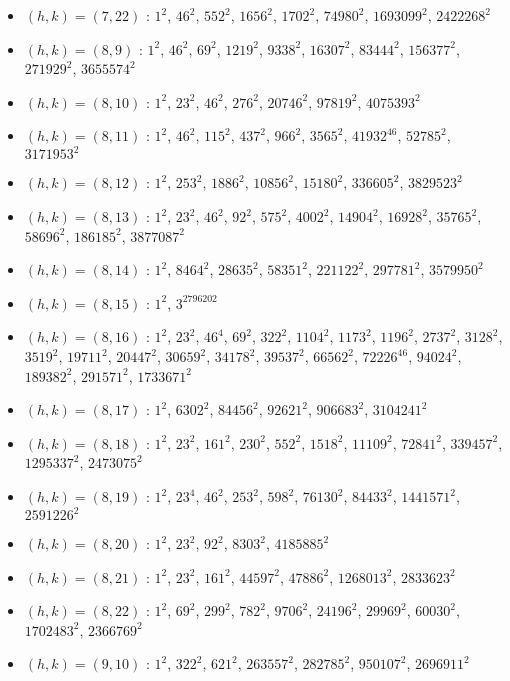 \begin{itemize}
\item $(h,k)=(7,22)$ : $1^{2}$, $46^{2}$, $552^{2}$, $1656^{2}$, $1702^{2}$, $74980^{2}$, $1693099^{2}$, $2422268^{2}$
\item $(h,k)=(8,9)$ : $1^{2}$, $46^{2}$, $69^{2}$, $1219^{2}$, $9338^{2}$, $16307^{2}$, $83444^{2}$, $156377^{2}$, $271929^{2}$, $3655574^{2}$
\item $(h,k)=(8,10)$ : $1^{2}$, $23^{2}$, $46^{2}$, $276^{2}$, $20746^{2}$, $97819^{2}$, $4075393^{2}$
\item $(h,k)=(8,11)$ : $1^{2}$, $46^{2}$, $115^{2}$, $437^{2}$, $966^{2}$, $3565^{2}$, $41932^{46}$, $52785^{2}$, $3171953^{2}$
\item $(h,k)=(8,12)$ : $1^{2}$, $253^{2}$, $1886^{2}$, $10856^{2}$, $15180^{2}$, $336605^{2}$, $3829523^{2}$
\item $(h,k)=(8,13)$ : $1^{2}$, $23^{2}$, $46^{2}$, $92^{2}$, $575^{2}$, $4002^{2}$, $14904^{2}$, $16928^{2}$, $35765^{2}$, $58696^{2}$, $186185^{2}$, $3877087^{2}$
\item $(h,k)=(8,14)$ : $1^{2}$, $8464^{2}$, $28635^{2}$, $58351^{2}$, $221122^{2}$, $297781^{2}$, $3579950^{2}$
\item $(h,k)=(8,15)$ : $1^{2}$, $3^{2796202}$
\item $(h,k)=(8,16)$ : $1^{2}$, $23^{2}$, $46^{4}$, $69^{2}$, $322^{2}$, $1104^{2}$, $1173^{2}$, $1196^{2}$, $2737^{2}$, $3128^{2}$, $3519^{2}$, $19711^{2}$, $20447^{2}$, $30659^{2}$, $34178^{2}$, $39537^{2}$, $66562^{2}$, $72226^{46}$, $94024^{2}$, $189382^{2}$, $291571^{2}$, $1733671^{2}$
\item $(h,k)=(8,17)$ : $1^{2}$, $6302^{2}$, $84456^{2}$, $92621^{2}$, $906683^{2}$, $3104241^{2}$
\item $(h,k)=(8,18)$ : $1^{2}$, $23^{2}$, $161^{2}$, $230^{2}$, $552^{2}$, $1518^{2}$, $11109^{2}$, $72841^{2}$, $339457^{2}$, $1295337^{2}$, $2473075^{2}$
\item $(h,k)=(8,19)$ : $1^{2}$, $23^{4}$, $46^{2}$, $253^{2}$, $598^{2}$, $76130^{2}$, $84433^{2}$, $1441571^{2}$, $2591226^{2}$
\item $(h,k)=(8,20)$ : $1^{2}$, $23^{2}$, $92^{2}$, $8303^{2}$, $4185885^{2}$
\item $(h,k)=(8,21)$ : $1^{2}$, $23^{2}$, $161^{2}$, $44597^{2}$, $47886^{2}$, $1268013^{2}$, $2833623^{2}$
\item $(h,k)=(8,22)$ : $1^{2}$, $69^{2}$, $299^{2}$, $782^{2}$, $9706^{2}$, $24196^{2}$, $29969^{2}$, $60030^{2}$, $1702483^{2}$, $2366769^{2}$
\item $(h,k)=(9,10)$ : $1^{2}$, $322^{2}$, $621^{2}$, $263557^{2}$, $282785^{2}$, $950107^{2}$, $2696911^{2}$

\end{itemize}
